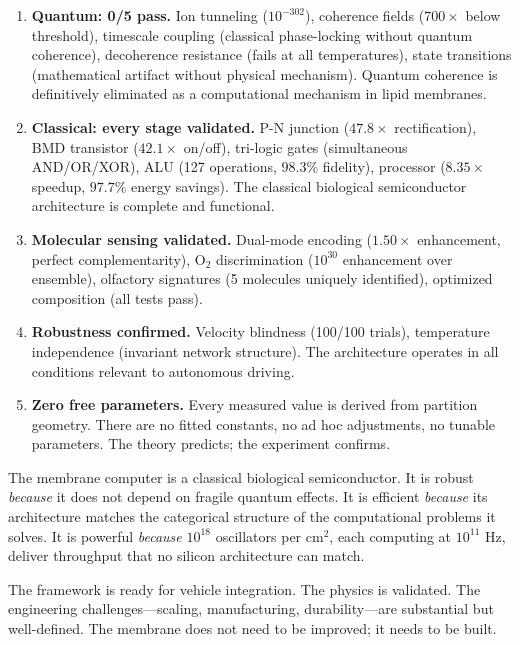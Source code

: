 \documentclass[twocolumn,10pt,a4paper]{article}
\theoremstyle{definition}
\theoremstyle{remark}
\begin{document}
\begin{enumerate}[leftmargin=2em]
    \item \textbf{Quantum: 0/5 pass.} Ion tunneling ($10^{-302}$), coherence fields ($700\times$ below threshold), timescale coupling (classical phase-locking without quantum coherence), decoherence resistance (fails at all temperatures), state transitions (mathematical artifact without physical mechanism). Quantum coherence is definitively eliminated as a computational mechanism in lipid membranes.

    \item \textbf{Classical: every stage validated.} P-N junction ($47.8\times$ rectification), BMD transistor ($42.1\times$ on/off), tri-logic gates (simultaneous AND/OR/XOR), ALU (127 operations, $98.3\%$ fidelity), processor ($8.35\times$ speedup, $97.7\%$ energy savings). The classical biological semiconductor architecture is complete and functional.

    \item \textbf{Molecular sensing validated.} Dual-mode encoding ($1.50\times$ enhancement, perfect complementarity), O$_2$ discrimination ($10^{30}$ enhancement over ensemble), olfactory signatures (5 molecules uniquely identified), optimized composition (all tests pass).

    \item \textbf{Robustness confirmed.} Velocity blindness (100/100 trials), temperature independence (invariant network structure). The architecture operates in all conditions relevant to autonomous driving.

    \item \textbf{Zero free parameters.} Every measured value is derived from partition geometry. There are no fitted constants, no ad hoc adjustments, no tunable parameters. The theory predicts; the experiment confirms.
\end{enumerate}

The membrane computer is a classical biological semiconductor. It is robust \emph{because} it does not depend on fragile quantum effects. It is efficient \emph{because} its architecture matches the categorical structure of the computational problems it solves. It is powerful \emph{because} $10^{18}$ oscillators per cm$^2$, each computing at $10^{11}$ Hz, deliver throughput that no silicon architecture can match.

The framework is ready for vehicle integration. The physics is validated. The engineering challenges---scaling, manufacturing, durability---are substantial but well-defined. The membrane does not need to be improved; it needs to be built.
\end{document}
